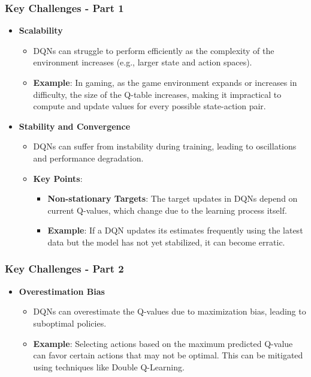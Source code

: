\documentclass[aspectratio=169]{beamer}
\begin{document}
\begin{frame}[fragile]
    \frametitle{Key Challenges - Part 1}
    \begin{itemize}
        \item \textbf{Scalability}
            \begin{itemize}
                \item DQNs can struggle to perform efficiently as the complexity of the environment increases (e.g., larger state and action spaces).
                \item \textbf{Example}: In gaming, as the game environment expands or increases in difficulty, the size of the Q-table increases, making it impractical to compute and update values for every possible state-action pair.
            \end{itemize}

        \item \textbf{Stability and Convergence}
            \begin{itemize}
                \item DQNs can suffer from instability during training, leading to oscillations and performance degradation.
                \item \textbf{Key Points}:
                    \begin{itemize}
                        \item \textbf{Non-stationary Targets}: The target updates in DQNs depend on current Q-values, which change due to the learning process itself.
                        \item \textbf{Example}: If a DQN updates its estimates frequently using the latest data but the model has not yet stabilized, it can become erratic.
                    \end{itemize}
            \end{itemize}
    \end{itemize}
\end{frame}

\begin{frame}[fragile]
    \frametitle{Key Challenges - Part 2}
    \begin{itemize}
        \item \textbf{Overestimation Bias}
            \begin{itemize}
                \item DQNs can overestimate the Q-values due to maximization bias, leading to suboptimal policies.
                \item \textbf{Example}: Selecting actions based on the maximum predicted Q-value can favor certain actions that may not be optimal. This can be mitigated using techniques like Double Q-Learning.
            \end{itemize}
    \end{itemize}
\end{frame}
\end{document}
